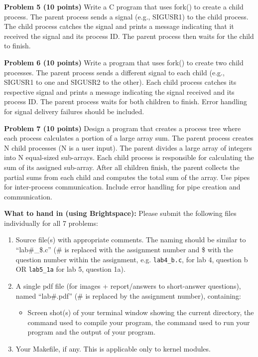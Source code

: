 \documentclass{article}
\begin{document}
\textbf{Problem 5 (10 points)} Write a C program that uses fork() to create a child process. The parent process sends a signal (e.g., SIGUSR1) to the child process. The child process catches the signal and prints a message indicating that it received the signal and its process ID.  The parent process then waits for the child to finish.


\textbf{Problem 6 (10 points)}  Write a program that uses fork() to create two child processes. The parent process sends a different signal to each child (e.g., SIGUSR1 to one and SIGUSR2 to the other). Each child process catches its respective signal and prints a message indicating the signal received and its process ID.  The parent process waits for both children to finish.  Error handling for signal delivery failures should be included.


\textbf{Problem 7 (10 points)}  Design a program that creates a process tree where each process calculates a portion of a large array sum. The parent process creates N child processes (N is a user input).  The parent divides a large array of integers into N equal-sized sub-arrays. Each child process is responsible for calculating the sum of its assigned sub-array. After all children finish, the parent collects the partial sums from each child and computes the total sum of the array.  Use pipes for inter-process communication.  Include error handling for pipe creation and communication.


\textbf{What to hand in (using Brightspace): }
Please submit the following files individually for all 7 problems:
\begin{enumerate}
    \item Source file(s) with appropriate comments. The naming should be similar to “lab\#\_\$.c” (\# is replaced with the assignment number and \$ with the question number within the assignment, e.g. \texttt{lab4\_b.c}, for lab 4, question b OR \texttt{lab5\_1a} for lab 5, question 1a).
    \item A single pdf file (for images + report/answers to short-answer questions), named “lab\#.pdf” (\# is replaced by the assignment number), containing:
    \begin{itemize}
        \item Screen shot(s) of your terminal window showing the current directory, the command used to compile your program, the command used to run your program and the output of your program.
    \end{itemize}
    \item Your Makefile, if any. This is applicable only to kernel modules.
\end{enumerate}
\end{document}
